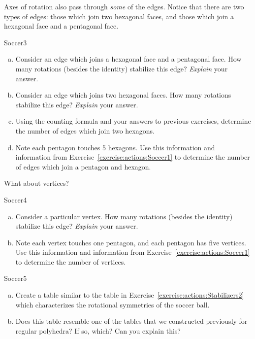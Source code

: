 Axes of rotation also pass through \emph{some} of the edges. Notice that there are two types of edges: those which join two hexagonal faces, and those which join a hexagonal face and a pentagonal face.

\begin{exercise}{Soccer3}
\begin{enumerate}[(a)]
\item
Consider an edge which joins a hexagonal face and a pentagonal face. How many rotations (besides the identity) stabilize this edge?  \emph{Explain} your answer.
\item
Consider an edge which joins two hexagonal faces. How many rotations stabilize this edge?  \emph{Explain} your answer.
\item
Using the counting formula and your answers to previous exercises, determine the number of edges which join  two hexagons.
\item
Note each pentagon touches 5 hexagons. Use this information and information from Exercise~\ref{exercise:actions:Soccer1} to determine the number of edges which join a pentagon and hexagon.
\end{enumerate}
\end {exercise}

What about vertices?

\begin{exercise}{Soccer4}
\begin{enumerate}[(a)]
\item
Consider a particular vertex. How many rotations (besides the identity) stabilize this edge?  \emph{Explain} your answer.
\item
Note each vertex touches one pentagon, and each pentagon has five vertices. Use this information and information from Exercise~\ref{exercise:actions:Soccer1} to determine the number of vertices.
\end{enumerate}
\end {exercise}

\begin{exercise}{Soccer5}
\begin{enumerate}[(a)]
\item
Create a table similar to the table in Exercise~\ref{exercise:actions:Stabilizers2} which characterizes the rotational symmetries of the soccer ball.
\item
Does this table resemble one of the tables that we constructed previously for regular polyhedra? If so, which? Can you explain this?
\end{enumerate}
\end {exercise}


